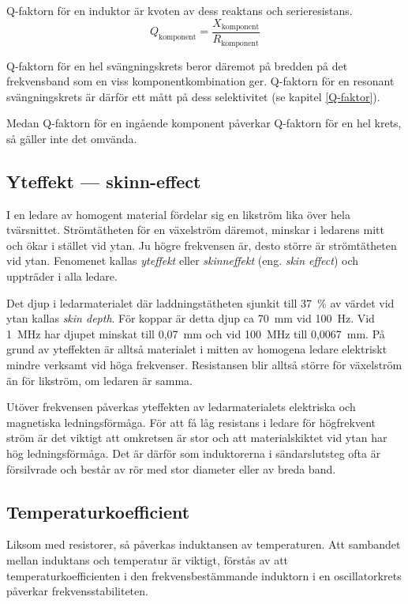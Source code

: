 Q-faktorn för en induktor är kvoten av dess reaktans och serieresistans.
\[ Q_\text{komponent} = \dfrac{X_\text{komponent}}{R_\text{komponent}} \]

Q-faktorn för en hel svängningskrets beror däremot på bredden på det
frekvensband som en viss komponentkombination ger.
Q-faktorn för en resonant svängningskrets är därför ett mått på dess
selektivitet (se kapitel \ref{Q-faktor}).

Medan Q-faktorn för en ingående komponent påverkar Q-faktorn för en hel krets,
så gäller inte det omvända.

\subsection{Yteffekt --- skinn-effect}

I en ledare av homogent material fördelar sig en likström lika över hela
tvärsnittet. Strömtätheten för en växelström däremot, minskar i ledarens mitt
och ökar i stället vid ytan.
Ju högre frekvensen är, desto större är strömtätheten vid ytan.
Fenomenet kallas \emph{yteffekt} eller \emph{skinneffekt} (eng. 
\emph{skin effect}) och uppträder i alla ledare.

Det djup i ledarmaterialet där laddningstätheten sjunkit till 37~\% av
värdet vid ytan kallas \emph{skin depth}. För koppar är detta djup ca 70~mm vid
100~Hz. Vid 1~MHz har djupet minskat till 0,07~mm och vid 100~MHz till
0,0067~mm. På grund av yteffekten är alltså materialet i mitten av homogena
ledare elektriskt mindre verksamt vid höga frekvenser. Resistansen blir alltså
större för växelström än för likström, om ledaren är samma.

Utöver frekvensen påverkas yteffekten av ledarmaterialets elektriska och
magnetiska ledningsförmåga. För att få låg resistans i ledare för högfrekvent
ström är det viktigt att omkretsen är stor och att materialskiktet vid ytan har
hög ledningsförmåga. Det är därför som induktorerna i sändarslutsteg ofta är
försilvrade och består av rör med stor diameter eller av breda band.

\subsection{Temperaturkoefficient}

Liksom med resistorer, så påverkas induktansen av temperaturen. Att sambandet
mellan induktans och temperatur är viktigt, förstås av att
temperaturkoefficienten i den frekvensbestämmande induktorn i en oscillatorkrets
påverkar frekvensstabiliteten.

